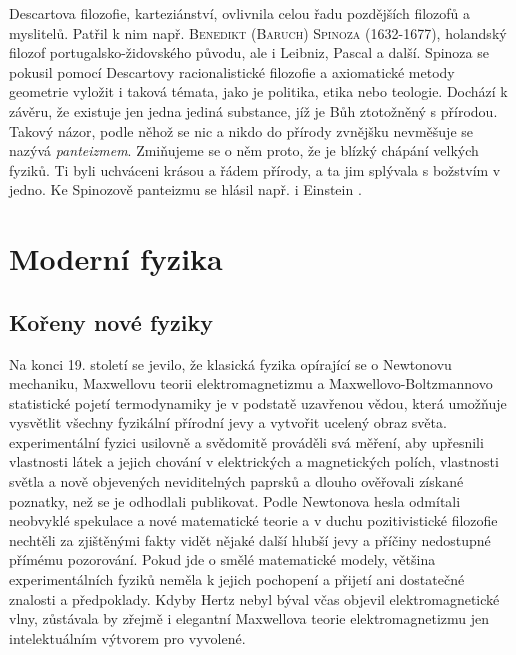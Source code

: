       Descartova filozofie, karteziánství, ovlivnila celou řadu pozdějších filozofů a myslitelů.
      Patřil k nim např. \textsc{Benedikt (Baruch) Spinoza} (1632-1677), holandský filozof
      portugalsko-židovského původu, ale i Leibniz, Pascal a další. Spinoza se pokusil pomocí
      Descartovy racionalistické filozofie a axiomatické metody geometrie vyložit i taková témata,
      jako je politika, etika nebo teologie. Dochází k závěru, že existuje jen jedna jediná
      substance, jíž je Bůh ztotožněný s přírodou. Takový názor, podle něhož se nic a nikdo do
      přírody zvnějšku nevměšuje se nazývá \emph{panteizmem}. Zmiňujeme se o něm proto, že je blízký
      chápání velkých fyziků. Ti byli uchváceni krásou a řádem přírody, a ta jim splývala s božstvím
      v jedno. Ke Spinozově panteizmu se hlásil např. i Einstein \cite[s.~141]{Stoll2009}.    
  \section{Moderní fyzika}\label{fyz:IchapIIsecIV}
    \subsection{Kořeny nové fyziky}\label{fyz:IchapIIsecIVssecI}
      Na konci 19. století se jevilo, že klasická fyzika opírající se o Newtonovu mechaniku,
      Maxwellovu teorii elektromagnetizmu a Maxwellovo-Boltzmannovo statistické pojetí termodynamiky
      je v podstatě uzavřenou vědou, která umožňuje vysvětlit všechny fyzikální přírodní jevy a
      vytvořit ucelený obraz světa.  experimentální fyzici usilovně a svědomitě
      prováděli svá měření, aby upřesnili vlastnosti látek a jejich chování v elektrických a
      magnetických polích, vlastnosti světla a nově objevených neviditelných paprsků a dlouho
      ověřovali získané poznatky, než se je odhodlali publikovat. Podle Newtonova hesla  odmítali neobvyklé spekulace a nové matematické teorie a v duchu pozitivistické
      filozofie nechtěli za zjištěnými fakty vidět nějaké další hlubší jevy a příčiny nedostupné
      přímému pozorování. Pokud jde o smělé matematické modely, většina experimentálních fyziků
      neměla k jejich pochopení a přijetí ani dostatečné znalosti a předpoklady. Kdyby Hertz nebyl
      býval včas objevil elektromagnetické vlny, zůstávala by zřejmě i elegantní Maxwellova teorie
      elektromagnetizmu jen intelektuálním výtvorem pro vyvolené.

